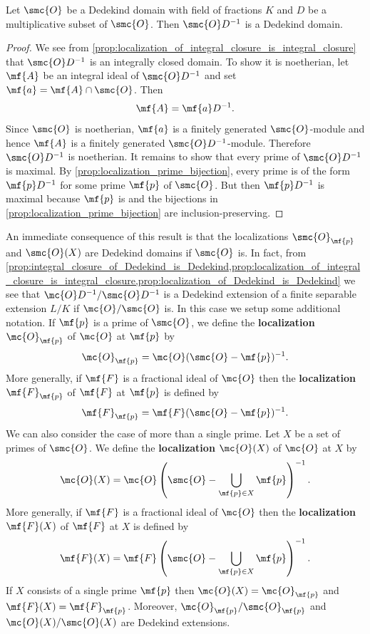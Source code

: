    \begin{proposition}\label{prop:localization_of_Dedekind_is_Dedekind}
      Let \(\smc{O}\) be a Dedekind domain with field of fractions \(K\) and \(D\) be a multiplicative subset of \(\smc{O}\). Then \(\smc{O}D^{-1}\) is a Dedekind domain.
    \end{proposition}
    \begin{proof}
      We see from \cref{prop:localization_of_integral_closure_is_integral_closure} that \(\smc{O}D^{-1}\) is an integrally closed domain. To show it is noetherian, let \(\mf{A}\) be an integral ideal of \(\smc{O}D^{-1}\) and set \(\mf{a} = \mf{A} \cap \smc{O}\). Then
      \[
        \mf{A} = \mf{a}D^{-1}.
      \]
      Since \(\smc{O}\) is noetherian, \(\mf{a}\) is a finitely generated \(\smc{O}\)-module and hence \(\mf{A}\) is a finitely generated \(\smc{O}D^{-1}\)-module. Therefore \(\smc{O}D^{-1}\) is noetherian. It remains to show that every prime of \(\smc{O}D^{-1}\) is maximal. By \cref{prop:localization_prime_bijection}, every prime is of the form \(\mf{p}D^{-1}\) for some prime \(\mf{p}\) of \(\smc{O}\). But then \(\mf{p}D^{-1}\) is maximal because \(\mf{p}\) is and the bijections in \cref{prop:localization_prime_bijection} are inclusion-preserving.
    \end{proof}

    An immediate consequence of this result is that the localizations \(\smc{O}_{\mf{p}}\) and \(\smc{O}(X)\) are Dedekind domains if \(\smc{O}\) is. In fact, from \cref{prop:integral_closure_of_Dedekind_is_Dedekind,prop:localization_of_integral_closure_is_integral_closure,prop:localization_of_Dedekind_is_Dedekind} we see that \(\mc{O}D^{-1}/\smc{O}D^{-1}\) is a Dedekind extension of a finite separable extension \(L/K\) if \(\mc{O}/\smc{O}\) is. In this case we setup some additional notation. If \(\mf{p}\) is a prime of \(\smc{O}\), we define the \textbf{localization} \(\mc{O}_{\mf{p}}\) of \(\mc{O}\) at \(\mf{p}\) by
    \[
      \mc{O}_{\mf{p}} = \mc{O}(\smc{O}-\mf{p})^{-1}.
    \]
    More generally, if \(\mf{F}\) is a fractional ideal of \(\mc{O}\) then the \textbf{localization} \(\mf{F}_{\mf{p}}\) of \(\mf{F}\) at \(\mf{p}\) is defined by
    \[
      \mf{F}_{\mf{p}} = \mf{F}(\smc{O}-\mf{p})^{-1}.
    \]
    We can also consider the case of more than a single prime. Let \(X\) be a set of primes of \(\smc{O}\). We define the \textbf{localization} \(\mc{O}(X)\) of \(\mc{O}\) at \(X\) by
    \[
      \mc{O}(X) = \mc{O}\left(\smc{O}-\bigcup_{\mf{p} \in X}\mf{p}\right)^{-1}.
    \]
    More generally, if \(\mf{F}\) is a fractional ideal of \(\mc{O}\) then the \textbf{localization} \(\mf{F}(X)\) of \(\mf{F}\) at \(X\) is defined by
    \[
      \mf{F}(X) = \mf{F}\left(\smc{O}-\bigcup_{\mf{p} \in X}\mf{p}\right)^{-1}.
    \]
    If \(X\) consists of a single prime \(\mf{p}\) then \(\mc{O}(X) = \mc{O}_{\mf{p}}\) and \(\mf{F}(X) = \mf{F}_{\mf{p}}\). Moreover, \(\mc{O}_{\mf{p}}/\smc{O}_{\mf{p}}\) and \(\mc{O}(X)/\smc{O}(X)\) are Dedekind extensions.
    
